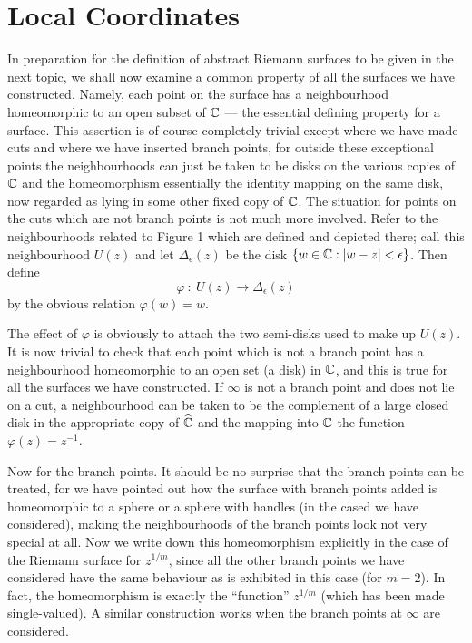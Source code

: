 \documentclass[a4paper,11pt]{article}
\newcounter{topic}
\begin{document}
\section{Local Coordinates}

In preparation for the definition of abstract Riemann surfaces to be
given in the next topic, we shall now examine a common property of
all the surfaces we have constructed.  Namely, each point on the
surface has a neighbourhood homeomorphic to an open subset of ${\mathbb C}$
--- the essential defining property for a surface.  This assertion is
of course completely trivial except where we have made cuts and where
we have inserted branch points, for outside these exceptional points
the neighbourhoods can just be taken to be disks on the various copies
of ${\mathbb C}$ and the homeomorphism essentially the identity mapping  on
the same disk, now regarded as lying in some other fixed copy of
${\mathbb C}$.  The situation for points on the cuts which are not branch
points is not much more involved.  Refer to the neighbourhoods
related to Figure 1 which are defined and depicted there; call this
neighbourhood $U(z)$ and let $\Delta_\epsilon(z)$ be the disk $\{w\in
{\mathbb C} : |w-z|<\epsilon\}$.  Then define
$$
\varphi ~:~ U(z) \to \Delta_\epsilon(z)
$$
by the obvious relation $\varphi(w) = w$.

The effect of $\varphi$ is obviously to attach the two semi-disks used
to make up $U(z)$.  It is now trivial to check that each point which
is not a branch point has a neighbourhood homeomorphic to an open set
(a disk) in ${\mathbb C}$, and this is true for all the surfaces we have
constructed.  If $\infty$ is not a branch point and does not lie on a
cut, a neighbourhood can be taken to be the complement of a large
closed disk in the appropriate copy of $\widehat{{\mathbb C}}$ and the
mapping into ${\mathbb C}$ the function $\varphi(z) = z^{-1}$.

Now for the branch points.  It should be no surprise that the branch
points can be treated, for we have pointed out how the surface with
branch points added is homeomorphic to a sphere or a sphere with
handles (in the cased we have considered), making the neighbourhoods
of the branch points look not very special at all.  Now we write down
this homeomorphism explicitly in the case of the Riemann surface for
$z^{1/m}$, since all the other branch points we have considered have
the same behaviour as is exhibited in this case (for $m=2$).  In fact,
the homeomorphism is exactly the ``function'' $z^{1/m}$ (which has
been made single-valued).  A similar construction works when the
branch points at $\infty$ are considered.
\end{document}
